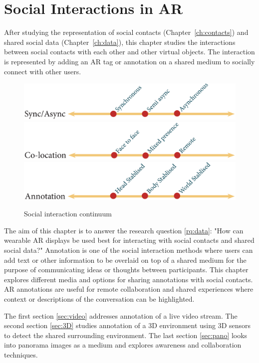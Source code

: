 \chapter{Social Interactions in AR}
\label{ch:annotation}


After studying the representation of social contacts (Chapter~\ref{ch:contacts}) and shared social data (Chapter~\ref{ch:data}), this chapter studies the interactions between social contacts with each other and other virtual objects. The interaction is represented by adding an AR tag or annotation on a shared medium to socially connect with other users.

\begin{figure}[h]
  \centering
  \includegraphics[width=\columnwidth]{images/continuum/continuum4.2-05.eps}
  \includegraphics[width=\columnwidth]{images/continuum/continuum4.2-06.eps}
  \includegraphics[width=\columnwidth]{images/continuum/continuum4.2-07.eps}
  \caption{Social interaction continuum}
  \label{fig:interaction:interaction-continuum}
\end{figure}

The aim of this chapter is to answer the research question \ref{rq:data}: "How can wearable AR displays be used best for interacting with social contacts and shared social data?"
Annotation is one of the social interaction methods where users can add text or other information to be overlaid on top of a shared medium for the purpose of communicating ideas or thoughts between participants. This chapter explores different media and options for sharing annotations with social contacts. AR annotations are useful for remote collaboration and shared experiences where context or descriptions of the conversation can be highlighted.

The first section \ref{sec:video} addresses annotation of a live video stream. The second section \ref{sec:3D} studies annotation of a 3D environment using 3D sensors to detect the shared surrounding environment. The last section \ref{sec:pano} looks into panorama images as a medium and explores awareness and collaboration techniques. 





